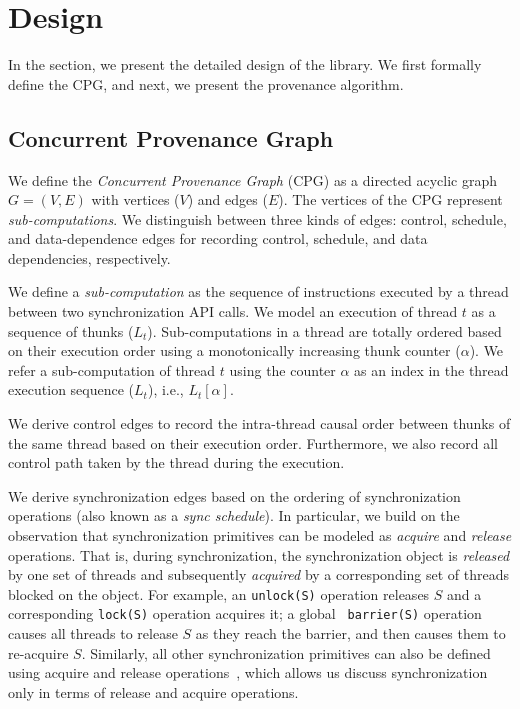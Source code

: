 \section{Design}
\label{sec:algorithms}
In the section, we present the detailed design of the \projecttitle library. We first formally define the CPG, and next, we present the provenance algorithm.

\subsection{Concurrent Provenance Graph}  We define the {\em
Concurrent Provenance Graph} (CPG)  as a directed acyclic graph $G =
(V,E)$ with vertices ($V$) and edges ($E$). The
vertices of the CPG represent {\em sub-computations}. We distinguish between three kinds of edges: control, schedule, and data-dependence edges for recording control, schedule, and data dependencies, respectively. 

 We define a {\em sub-computation}  as the sequence of instructions
executed by a thread between two \pthreads synchronization API calls. We model an execution of thread $t$ as a sequence of thunks
($L_t$). Sub-computations in a thread are totally ordered based on their execution order
using a monotonically increasing thunk counter ($\alpha$). We refer a sub-computation of thread $t$ using the counter $\alpha$ as an index in the thread execution sequence ($L_t$), i.e., $L_t[\alpha]$. 

 We derive control edges to record the intra-thread causal order between thunks of the same thread based on their execution order. Furthermore, we also record all control path taken by the thread during the execution.


 We derive synchronization edges based on the ordering of synchronization operations (also known as a {\em sync schedule}). In particular,  we build on the observation that synchronization primitives can be modeled as {\em acquire} and {\em release} operations. That is,   during synchronization, the synchronization object is {\em released} by one set of threads and subsequently  {\em acquired} by a corresponding set of threads blocked on the object. For example, an {\tt unlock(S)} operation releases $S$
and a corresponding {\tt lock(S)} operation acquires it; a global {\tt
barrier(S)} operation causes all threads to release $S$ as they reach the
barrier, and then causes them to re-acquire $S$. Similarly, all other
synchronization primitives can also be defined using acquire and release
operations~\cite{djit, fast-track-pldi}, which allows us discuss synchronization only in terms of release and acquire operations.


